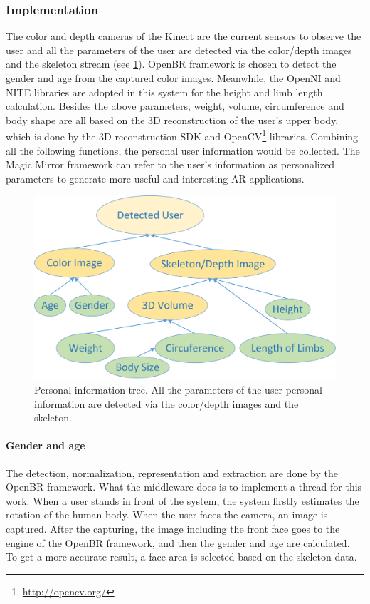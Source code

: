 \subsubsection{Implementation}
The color and depth cameras of the Kinect are the current sensors to observe the user and all the parameters of the user are detected via the color/depth images and the skeleton stream (see \figurename{\ref{fig:3-PRMM:BiomatricInformation}}). OpenBR framework is chosen to detect the gender and age from the captured color images. Meanwhile, the OpenNI and NITE libraries are adopted in this system for the height and limb length calculation. Besides the above parameters, weight, volume, circumference and body shape are all based on the 3D reconstruction of the user's upper body, which is done by the 3D reconstruction SDK and OpenCV\footnote{\url{http://opencv.org/}} libraries.
Combining all the following functions, the personal user information would be collected. The Magic Mirror framework can refer to the user's information as personalized parameters to generate more useful and interesting AR applications.
\begin{figure}
	\centering
	\includegraphics[width=0.75\linewidth]{figures/3-PRMM/BiomatricInformation}
	\caption{Personal information tree. All the parameters of the user personal information are detected via the color/depth images and the skeleton.}
	\label{fig:3-PRMM:BiomatricInformation}
\end{figure}

\paragraph{Gender and age}
The detection, normalization, representation and extraction are done by the OpenBR framework. What the middleware does is to implement a thread for this work. When a user stands in front of the system, the system firstly estimates the rotation of the human body. When the user faces the camera, an image is captured.  After the capturing, the image including the front face goes to the engine of the OpenBR framework, and then the gender and age are calculated. To get a more accurate result, a face area is selected based on the skeleton data. 

